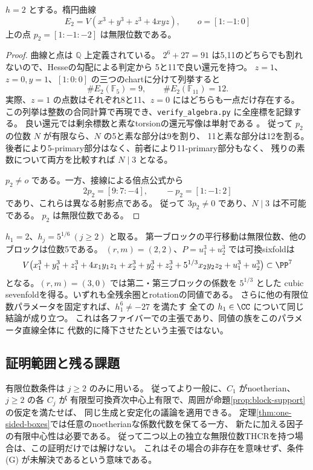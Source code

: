 \begin{lemma}[無限位数の明示的パラメータ]\label{lem:order-infinite}
 \(h=2\) とする。楕円曲線
 \[
 E_2=V(x^3+y^3+z^3+4xyz),\qquad o=[1:-1:0]
 \]
 上の点 \(p_2=[1:-1:-2]\) は無限位数である。
\end{lemma}
\begin{proof}
 曲線と点は \(\mathbb Q\) 上定義されている。
 \(2^6+27=91\) は5,11のどちらでも割れないので、Hesseの勾配による判定から
 5と11で良い還元を持つ。
 \(z=1\)、\(z=0,y=1\)、\([1:0:0]\) の三つのchartに分けて列挙すると
 \[
 \#E_2(\mathbb F_5)=9,\qquad \#E_2(\mathbb F_{11})=12.
 \]
 実際、\(z=1\) の点数はそれぞれ8と11、\(z=0\) にはどちらも一点だけ存在する。
 この列挙は整数の合同計算で再現でき、\texttt{verify\_algebra.py} に全座標を記録する。
 良い還元では剰余標数と素なtorsionの還元写像は単射である
 \cite[Reduction of torsion points]{SnowdenDVR}。
 従って \(p_2\) の位数 \(N\) が有限なら、\(N\) の5と素な部分は9を割り、
 11と素な部分は12を割る。後者により5-primary部分はなく、前者により11-primary部分もなく、
 残りの素数について両方を比較すれば \(N\mid3\) となる。

 \(p_2\ne o\) である。一方、接線による倍点公式から
 \[
 2p_2=[9:7:-4],\qquad -p_2=[1:-1:2]
 \]
 であり、これらは異なる射影点である。
 従って \(3p_2\ne0\) であり、\(N\mid3\) は不可能である。
 \(p_2\) は無限位数である。
\end{proof}

\begin{remark}[真に無限位数を含むsixfoldとsevenfold]
 \(h_1=2\)、\(h_j=5^{1/6}\ (j\ge2)\) と取る。
 第一ブロックの平行移動は無限位数、他のブロックは位数5である。
 \((r,m)=(2,2)\)、\(P=u_1^3+u_2^3\) では可換sixfoldは
 \[
 V\bigl(x_1^3+y_1^3+z_1^3+4x_1y_1z_1
       +x_2^3+y_2^3+z_2^3+5^{1/3}x_2y_2z_2+u_1^3+u_2^3\bigr)
 \subset\PP^7
 \]
 となる。\((r,m)=(3,0)\) では第二・第三ブロックの係数を \(5^{1/3}\) とした
 cubic sevenfoldを得る。いずれも全残余圏とrotationの同値である。
 さらに他の有限位数パラメータを固定すれば、\(h_1^6\ne-27\) を満たす
 全ての \(h_1\in\CC\) について同じ結論が成り立つ。
 これは各ファイバーでの主張であり、同値の族をこのパラメータ直線全体に
 代数的に降下させたという主張ではない。
\end{remark}

\subsection{証明範囲と残る課題}

有限位数条件は \(j\ge2\) のみに用いる。
従ってより一般に、\(C_1\) がnoetherian、\(j\ge2\) の各 \(C_j\) が
有限型可換斉次中心上有限で、周囲が命題\ref{prop:block-support}の仮定を満たせば、
同じ生成と安定化の議論を適用できる。
定理\ref{thm:one-sided-boxes}では任意のnoetherianな係数代数を保てる一方、
新たに加える因子の有限中心性は必要である。
従って二つ以上の独立な無限位数THCRを持つ場合は、この証明だけでは解けない。
これはその場合の非存在を意味せず、条件 (G) が未解決であるという意味である。

